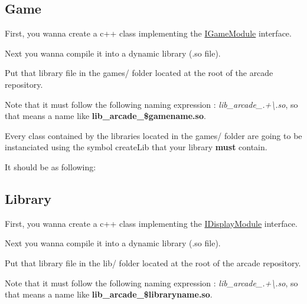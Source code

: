 \subsection*{Game}


\begin{DoxyItemize}
\item First, you wanna create a c++ class implementing the \mbox{\hyperlink{classArcade_1_1Games_1_1IGameModule}{I\+Game\+Module}} interface.
\item Next you wanna compile it into a dynamic library (.so file).
\item Put that library file in the {\ttfamily games/} folder located at the root of the arcade repository.
\begin{DoxyItemize}
\item Note that it must follow the following naming expression \+: {\itshape lib\+\_\+arcade\+\_\+.+\textbackslash{}.so}, so that means a name like {\bfseries{lib\+\_\+arcade\+\_\+\$gamename.\+so}}.
\end{DoxyItemize}
\end{DoxyItemize}

Every class contained by the libraries located in the {\ttfamily games/} folder are going to be instanciated using the symbol {\ttfamily create\+Lib} that your library {\bfseries{must}} contain.

It should be as following\+:


\begin{DoxyCode}{0}
\DoxyCodeLine{\{}
\DoxyCodeLine{\}}
\end{DoxyCode}


\subsection*{Library}


\begin{DoxyItemize}
\item First, you wanna create a c++ class implementing the \mbox{\hyperlink{classArcade_1_1Display_1_1IDisplayModule}{I\+Display\+Module}} interface.
\item Next you wanna compile it into a dynamic library (.so file).
\item Put that library file in the {\ttfamily lib/} folder located at the root of the arcade repository.
\begin{DoxyItemize}
\item Note that it must follow the following naming expression \+: {\itshape lib\+\_\+arcade\+\_\+.+\textbackslash{}.so}, so that means a name like {\bfseries{lib\+\_\+arcade\+\_\+\$libraryname.\+so}}.
\end{DoxyItemize}
\end{DoxyItemize}

